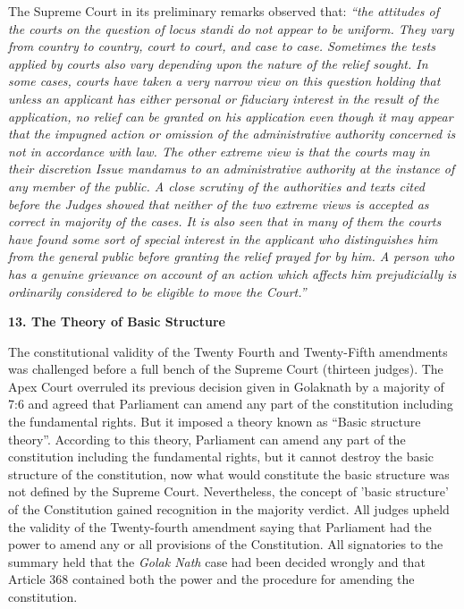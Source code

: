 \begin{multicols}{2}
\noi
The Supreme Court in its preliminary remarks observed that: \textit{“the attitudes of the
courts on the question of locus standi do not appear to be uniform. They vary from
country to country, court to court, and case to case. Sometimes the tests applied by
courts also vary depending upon the nature of the relief sought. In some cases, courts have taken a very narrow view on this question holding that unless an applicant has
either personal or fiduciary interest in the result of the application, no relief can be
granted on his application even though it may appear that the impugned action or
omission of the administrative authority concerned is not in accordance with law. The
other extreme view is that the courts may in their discretion Issue mandamus to an
administrative authority at the instance of any member of the public. A close scrutiny
of the authorities and texts cited before the Judges showed that neither of the two
extreme views is accepted as correct in majority of the cases. It is also seen that in many
of them the courts have found some sort of special interest in the applicant who
distinguishes him from the general public before granting the relief prayed for by him.
A person who has a genuine grievance on account of an action which affects him
prejudicially is ordinarily considered to be eligible to move the Court.”}

\noi
{\bf 13. The Theory of Basic Structure}

\noi
The constitutional validity of the Twenty Fourth and Twenty-Fifth amendments was
challenged before a full bench of the Supreme Court (thirteen judges). The Apex Court
overruled its previous decision given in Golaknath by a majority of 7:6 and agreed that
Parliament can amend any part of the constitution including the fundamental rights.
But it imposed a theory known as “Basic structure theory”. According to this theory,
Parliament can amend any part of the constitution including the fundamental rights,
but it cannot destroy the basic structure of the constitution, now what would constitute
the basic structure was not defined by the Supreme Court. Nevertheless, the concept
of 'basic structure' of the Constitution gained recognition in the majority verdict. All
judges upheld the validity of the Twenty-fourth amendment saying that Parliament had
the power to amend any or all provisions of the Constitution. All signatories to the
summary held that the \textit{Golak Nath} case had been decided wrongly and that Article 368
contained both the power and the procedure for amending the constitution.


\end{multicols}
